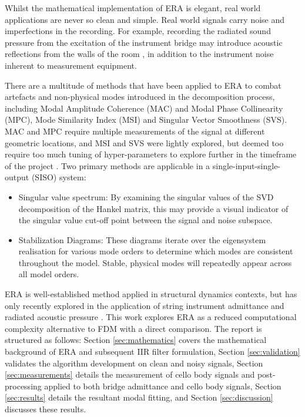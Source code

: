 Whilst the mathematical implementation of ERA is elegant, real world applications are never so clean and simple. Real world signals carry noise and imperfections in the recording. For example, recording the radiated sound pressure from the excitation of the instrument bridge may introduce acoustic reflections from the walls of the room \cite{haasjes2024}, in addition to the instrument noise inherent to measurement equipment.

There are a multitude of methods that have been applied to ERA to combat artefacts and non-physical modes introduced in the decomposition process, including Modal Amplitude Coherence (MAC) and Modal Phase Collinearity (MPC), Mode Similarity Index (MSI) and Singular Vector Smoothness (SVS). MAC and MPC require multiple measurements of the signal at different geometric locations, and MSI and SVS were lightly explored, but deemed too require too much tuning of hyper-parameters to explore further in the timeframe of the project \cite{caicedo2010, uradnicek2025, zhang2014, chen2020}. Two primary methods are applicable in a single-input-single-output (SISO) system:
\begin{itemize}
    \item Singular value spectrum: By examining the singular values of the SVD decomposition of the Hankel matrix, this may provide a visual indicator of the singular value cut-off point between the signal and noise subspace.
    \item Stabilization Diagrams: These diagrams iterate over the eigensystem realisation for various mode orders to determine which modes are consistent throughout the model. Stable, physical modes will repeatedly appear across all model orders.
\end{itemize}

ERA is well-established method applied in structural dynamics contexts, but has only recently explored in the application of string instrument admittance and radiated acoustic pressure \cite{dafx2026}. This work explores ERA as a reduced computational complexity alternative to FDM with a direct comparison.
The report is structured as follows: Section \ref{sec:mathematics} covers the mathematical background of ERA and subsequent IIR filter formulation, Section \ref{sec:validation} validates the algorithm development on clean and noisy signals, Section \ref{sec:measurements} details the measurement of cello body signals and post-processing applied to both bridge admittance and cello body signals, Section \ref{sec:results} details the resultant modal fitting, and Section \ref{sec:discussion} discusses these results.
